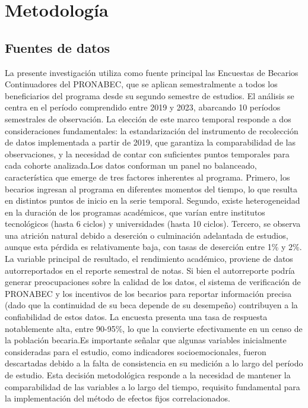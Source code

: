 \documentclass[12pt, a4paper]{article} %
\begin{document}
\section{Metodología}

\subsection{Fuentes de datos}
La presente investigación utiliza como fuente principal las Encuestas de Becarios Continuadores del PRONABEC, que se aplican semestralmente a todos los beneficiarios del programa desde su segundo semestre de estudios. El análisis se centra en el período comprendido entre 2019 y 2023, abarcando 10 períodos semestrales de observación. La elección de este marco temporal responde a dos consideraciones fundamentales: la estandarización del instrumento de recolección de datos implementada a partir de 2019, que garantiza la comparabilidad de las observaciones, y la necesidad de contar con suficientes puntos temporales para cada cohorte analizada.Los datos conforman un panel no balanceado, característica que emerge de tres factores inherentes al programa. Primero, los becarios ingresan al programa en diferentes momentos del tiempo, lo que resulta en distintos puntos de inicio en la serie temporal. Segundo, existe heterogeneidad en la duración de los programas académicos, que varían entre institutos tecnológicos (hasta 6 ciclos) y universidades (hasta 10 ciclos). Tercero, se observa una atrición natural debido a deserción o culminación adelantada de estudios, aunque esta pérdida es relativamente baja, con tasas de deserción entre 1\% y 2\%.
La variable principal de resultado, el rendimiento académico, proviene de datos autorreportados en el reporte semestral de notas. Si bien el autorreporte podría generar preocupaciones sobre la calidad de los datos, el sistema de verificación de PRONABEC y los incentivos de los becarios para reportar información precisa (dado que la continuidad de su beca depende de su desempeño) contribuyen a la confiabilidad de estos datos. La encuesta presenta una tasa de respuesta notablemente alta, entre 90-95\%, lo que la convierte efectivamente en un censo de la población becaria.Es importante señalar que algunas variables inicialmente consideradas para el estudio, como indicadores socioemocionales, fueron descartadas debido a la falta de consistencia en su medición a lo largo del período de estudio. Esta decisión metodológica responde a la necesidad de mantener la comparabilidad de las variables a lo largo del tiempo, requisito fundamental para la implementación del método de efectos fijos correlacionados. 
\end{document}

